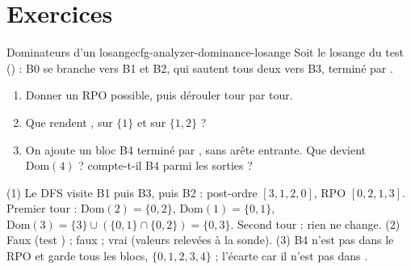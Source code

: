 \section*{Exercices}
\label{sec:cfg-analyzer-dominance-exercices}

\begin{exercice}{Dominateurs d'un losange}{cfg-analyzer-dominance-losange}
  Soit le losange du test 
  () : B0 se branche vers B1 et B2,
  qui sautent tous deux vers B3, terminé par .
  \begin{enumerate}
    \item Donner un RPO possible, puis dérouler 
      tour par tour.
    \item Que rendent ,  sur
      $\{1\}$ et  sur $\{1, 2\}$ ?
    \item On ajoute un bloc B4 terminé par , sans arête
      entrante. Que devient $\mathrm{Dom}(4)$ ? 
      compte-t-il B4 parmi les sorties ?
  \end{enumerate}
\end{exercice}
\begin{solution}
  (1) Le DFS visite B1 puis B3, puis B2 : post-ordre $[3,1,2,0]$, RPO
  $[0,2,1,3]$. Premier tour : $\mathrm{Dom}(2) = \{0,2\}$, $\mathrm{Dom}(1)
  = \{0,1\}$, $\mathrm{Dom}(3) = \{3\} \cup (\{0,1\} \cap \{0,2\}) =
  \{0,3\}$. Second tour : rien ne change. (2) Faux (test
  ) ; faux ; vrai (valeurs
  relevées à la sonde). (3) B4 n'est pas dans le RPO et garde tous les
  blocs, $\{0,1,2,3,4\}$ ;  l'écarte car il n'est pas
  dans .
\end{solution}

